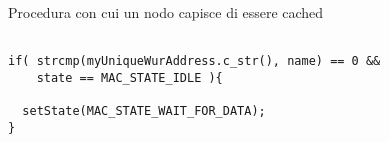 \begin{listing}[h]
    \caption{Procedura con cui un nodo capisce di essere cached}
    \label{code:detectWUM}
    \begin{verbatim}

if( strcmp(myUniqueWurAddress.c_str(), name) == 0 &&
    state == MAC_STATE_IDLE ){
    
  setState(MAC_STATE_WAIT_FOR_DATA);
}

    \end{verbatim}
\end{listing}